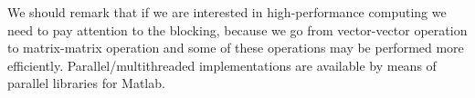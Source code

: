 \documentclass[computationalMathematics.tex]{subfiles}
\begin{document}
\begin{obs}
We should remark that if we are interested in high-performance computing we need to pay attention to the blocking, because we go from vector-vector operation to matrix-matrix operation and some of these operations may be performed more efficiently. Parallel/multithreaded implementations are available by means of parallel libraries for Matlab.
\end{obs}

\end{document}
